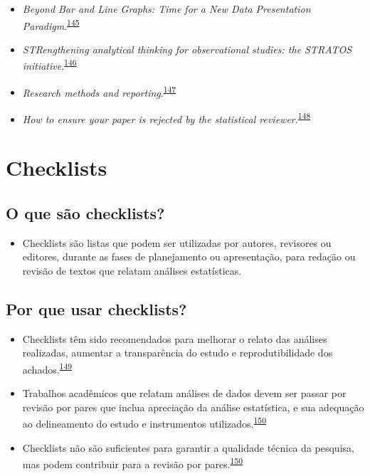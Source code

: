 \documentclass[
]{book}
\providecommand{\tightlist}{%
  \setlength{\itemsep}{0pt}\setlength{\parskip}{0pt}}
\begin{document}
\begin{itemize}
\item
  \emph{Beyond Bar and Line Graphs: Time for a New Data Presentation Paradigm}.\textsuperscript{\protect\hyperlink{ref-Weissgerber2015}{145}}
\item
  \emph{STRengthening analytical thinking for observational studies: the STRATOS initiative}.\textsuperscript{\protect\hyperlink{ref-Sauerbrei2014}{146}}
\item
  \emph{Research methods and reporting}.\textsuperscript{\protect\hyperlink{ref-groves2008}{147}}
\item
  \emph{How to ensure your paper is rejected by the statistical reviewer}.\textsuperscript{\protect\hyperlink{ref-stratton2005}{148}}
\end{itemize}

\hypertarget{checklists}{%
\section{Checklists}\label{checklists}}

\hypertarget{o-que-suxe3o-checklists}{%
\subsection{O que são checklists?}\label{o-que-suxe3o-checklists}}

\begin{itemize}
\tightlist
\item
  Checklists são listas que podem ser utilizadas por autores, revisores ou editores, durante as fases de planejamento ou apresentação, para redação ou revisão de textos que relatam análises estatísticas.
\end{itemize}

\hypertarget{por-que-usar-checklists}{%
\subsection{Por que usar checklists?}\label{por-que-usar-checklists}}

\begin{itemize}
\item
  Checklists têm sido recomendados para melhorar o relato das análises realizadas, aumentar a transparência do estudo e reprodutibilidade dos achados.\textsuperscript{\protect\hyperlink{ref-Gardner1986}{149}}
\item
  Trabalhos acadêmicos que relatam análises de dados devem ser passar por revisão por pares que inclua apreciação da análise estatística, e sua adequação ao delineamento do estudo e instrumentos utilizados.\textsuperscript{\protect\hyperlink{ref-Mascha2017}{150}}
\item
  Checklists não são suficientes para garantir a qualidade técnica da pesquisa, mas podem contribuir para a revisão por pares.\textsuperscript{\protect\hyperlink{ref-Mascha2017}{150}}
\end{itemize}
\end{document}

